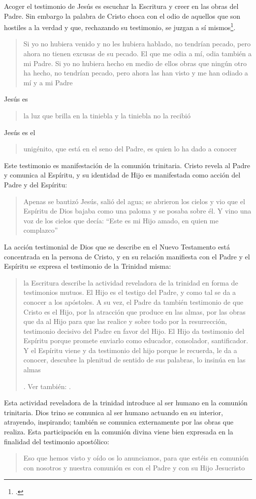 Acoger el testimonio de Jesús es escuchar la Escritura y creer en las obras del Padre. Sin embargo la palabra de Cristo choca con el odio de aquellos que son hostiles a la verdad y que, rechazando su testimonio, se juzgan a sí mismos\footnote{\Cite[Cf.][1530]{latourelle2000testimonio}.
}. \blockquote[][\,(Jn 15,22-24)]{Si yo no hubiera venido y no les hubiera hablado, no tendrían pecado, pero ahora no tienen excusas de su pecado. El que me odia a mí, odia también a mi Padre. Si yo no hubiera hecho en medio de ellos obras que ningún otro ha hecho, no tendrían pecado, pero ahora las han visto y me han odiado a mí y a mi Padre}.

Jesús es \blockquote[][\,(Jn 1,5)]{la luz que brilla en la tiniebla y la tiniebla no la recibió}. Jesús es el \blockquote[][\,(Jn 1,18)]{unigénito, que está en el seno del Padre, es quien lo ha dado a conocer}. Este testimonio es manifestación de la comunión trinitaria. Cristo revela al Padre y comunica al Espíritu, y su identidad de Hijo es manifestada como acción del Padre y del Espíritu: \blockquote[][\,(Mt 4,16-17)]{Apenas se bautizó Jesús, salió del agua; se abrieron los cielos y vio que el Espíritu de Dios bajaba como una paloma y se posaba sobre él. Y vino una voz de los cielos que decía: ``Este es mi Hijo amado, en quien me complazco''}.

La acción testimonial de Dios que se describe en el Nuevo Testamento está concentrada en la persona de Cristo, y en su relación manifiesta con el Padre y el Espíritu se expresa el testimonio de la Trinidad misma: \blockquote[{\Cite[410]{latourelle1999rev}}. Ver también: {\Cite[131]{prades2015testimonio}}.]{la Escritura describe la actividad reveladora de la trinidad en forma de testimonios mutuos. El Hijo es el testigo del Padre, y como tal se da a conocer a los apóstoles. A su vez, el Padre da también testimonio de que Cristo es el Hijo, por la atracción que produce en las almas, por las obras que da al Hijo para que las realice y sobre todo por la resurrección, testimonio decisivo del Padre en favor del Hijo. El Hijo da testimonio del Espíritu porque promete enviarlo como educador, consolador, santificador. Y el Espíritu viene y da testimonio del hijo porque le recuerda, le da a conocer, descubre la plenitud de sentido de sus palabras, lo insinúa en las almas}. Esta actividad reveladora de la trinidad introduce al ser humano en la comunión trinitaria. Dios trino se comunica al ser humano actuando en su interior, atrayendo, inspirando; también se comunica externamente por las obras que realiza. Esta participación en la comunión divina viene bien expresada en la finalidad del testimonio apostólico: \blockquote[][\,(1Jn 1,3)]{Eso que hemos visto y oído os lo anunciamos, para que estéis en comunión con nosotros y nuestra comunión es con el Padre y con su Hijo Jesucristo}.

